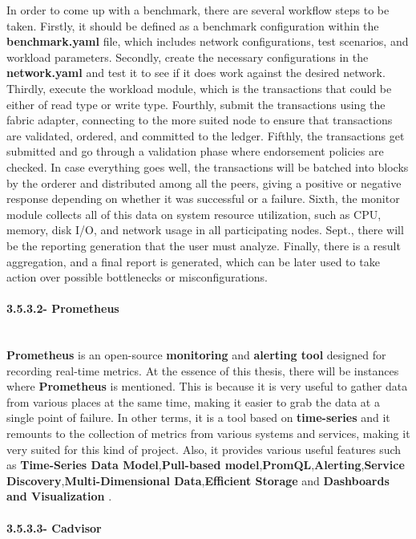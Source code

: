 In order to come up with a benchmark, there are several workflow steps to be taken. Firstly, it should be defined as a benchmark configuration within the \textbf{benchmark.yaml} file, which includes network configurations, test scenarios, and workload parameters. Secondly, create the necessary configurations in the \textbf{network.yaml} and test it to see if it does work against the desired network. Thirdly, execute the workload module, which is the transactions that could be either of read type or write type. Fourthly, submit the transactions using the fabric adapter, connecting to the more suited node to ensure that transactions are validated, ordered, and committed to the ledger. Fifthly, the transactions get submitted and go through a validation phase where endorsement policies are checked. In case everything goes well, the transactions will be batched into blocks by the orderer and distributed among all the peers, giving a positive or negative response depending on whether it was successful or a failure. Sixth, the monitor module collects all of this data on system resource utilization, such as CPU, memory, disk I/O, and network usage in all participating nodes. Sept., there will be the reporting generation that the user must analyze. Finally, there is a result aggregation, and a final report is generated, which can be later used to take action over possible bottlenecks or misconfigurations.

\paragraph{3.5.3.2- Prometheus}\mbox{}\\
\textbf{Prometheus} is an open-source \textbf{monitoring} and \textbf{alerting tool} designed for recording real-time metrics. At the essence of this thesis, there will be instances where \textbf{Prometheus} is mentioned. This is because it is very useful to gather data from various places at the same time, making it easier to grab the data at a single point of failure. In other terms, it is a tool based on \textbf{time-series} and it remounts to the collection of metrics from various systems and services, making it very suited for this kind of project. Also, it provides various useful features such as \textbf{Time-Series Data Model},\textbf{Pull-based model},\textbf{PromQL},\textbf{Alerting},\textbf{Service Discovery},\textbf{Multi-Dimensional Data},\textbf{Efficient Storage} and \textbf{Dashboards and Visualization} \cite{prometheus}.


\paragraph{3.5.3.3- Cadvisor}\mbox{}\\


